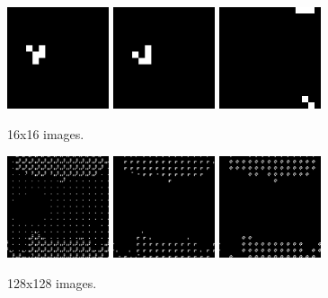 \documentclass{article}
\begin{document}
\newpage


\begin{multicols}{2}

\begin{figure}[H]
\centering
\includegraphics[width=3cm]{pngimages/16-1.png}
\includegraphics[width=3cm]{pngimages/16-2.png}
\includegraphics[width=3cm]{pngimages/16-100.png}
\caption{16x16 images.}
\end{figure}

\begin{figure}[H]
\centering
\includegraphics[width=3cm]{pngimages/128-1.png}
\includegraphics[width=3cm]{pngimages/128-2.png}
\includegraphics[width=3cm]{pngimages/128-100.png}
\caption{128x128 images.}
\end{figure}


\end{multicols}
\end{document}
